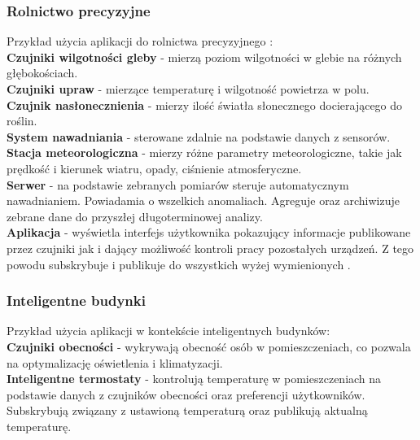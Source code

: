 \newpage

\subsubsection{Rolnictwo precyzyjne}
Przykład użycia aplikacji do rolnictwa precyzyjnego \cite{rolnictwoprecyzyjne}:\\

\textbf{Czujniki wilgotności gleby} - mierzą poziom wilgotności w glebie na różnych głębokościach.\\

\textbf{Czujniki upraw} - mierzące temperaturę i wilgotność powietrza w polu.\\

\textbf{Czujnik nasłonecznienia} - mierzy ilość światła słonecznego docierającego do roślin.\\

\textbf{System nawadniania} - sterowane zdalnie na podstawie danych z sensorów.\\

\textbf{Stacja meteorologiczna} - mierzy różne parametry meteorologiczne, takie jak prędkość i kierunek wiatru, opady, ciśnienie atmosferyczne.\\

\textbf{Serwer} - na podstawie zebranych pomiarów steruje automatycznym nawadnianiem. Powiadamia o wszelkich anomaliach. Agreguje oraz archiwizuje zebrane dane do przyszłej długoterminowej analizy.\\

\textbf{Aplikacja} - wyświetla interfejs użytkownika pokazujący informacje publikowane przez czujniki jak i dający możliwość kontroli pracy pozostałych urządzeń. Z tego powodu subskrybuje i publikuje do wszystkich wyżej wymienionych .\\

\newpage

\subsubsection{Inteligentne budynki}
Przykład użycia aplikacji w kontekście inteligentnych budynków:\\

\textbf{Czujniki obecności} - wykrywają obecność osób w pomieszczeniach, co pozwala na optymalizację oświetlenia i klimatyzacji.\\

\textbf{Inteligentne termostaty} - kontrolują temperaturę w pomieszczeniach na podstawie danych z czujników obecności oraz preferencji użytkowników. Subskrybują  związany z ustawioną temperaturą oraz publikują aktualną temperaturę.\\

